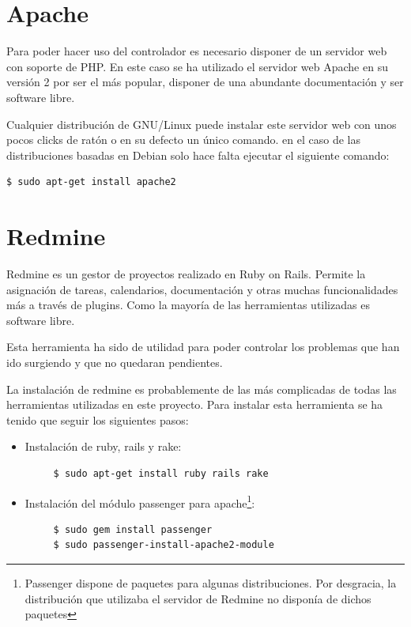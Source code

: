 \section{Apache}

Para poder hacer uso del controlador es necesario disponer de un servidor web con soporte de PHP. En este caso se ha utilizado el servidor web Apache en su versión 2 por ser el más popular, disponer de una abundante documentación y ser software libre.

Cualquier distribución de GNU/Linux puede instalar este servidor web con unos pocos clicks de ratón o en su defecto un único comando. en el caso de las distribuciones basadas en Debian solo hace falta ejecutar el siguiente comando:

\begin{verbatim}
$ sudo apt-get install apache2
\end{verbatim}

\section{Redmine}

Redmine es un gestor de proyectos realizado en Ruby on Rails. Permite la asignación de tareas, calendarios, documentación y otras muchas funcionalidades más a través de plugins. Como la mayoría de las herramientas utilizadas es software libre.

Esta herramienta ha sido de utilidad para poder controlar los problemas que han ido surgiendo y que no quedaran pendientes.

La instalación de redmine es probablemente de las más complicadas de todas las herramientas utilizadas en este proyecto. Para instalar esta herramienta se ha tenido que seguir los siguientes pasos:

\begin{itemize}
	 \item Instalación de ruby, rails y rake:
	 \begin{verbatim}
	 $ sudo apt-get install ruby rails rake
	 \end{verbatim}
	 
	 \item Instalación del módulo passenger para apache\footnote{Passenger dispone de paquetes para algunas distribuciones. Por desgracia, la distribución que utilizaba el servidor de Redmine no disponía de dichos paquetes}:
	 \begin{verbatim}
	 $ sudo gem install passenger
	 $ sudo passenger-install-apache2-module
	 \end{verbatim}
\end{itemize}


